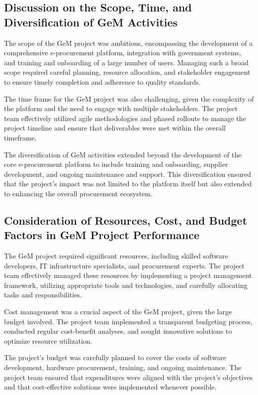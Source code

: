 \subsection{Discussion on the Scope, Time, and Diversification of GeM Activities}

The scope of the GeM project was ambitious, encompassing the development of a comprehensive e-procurement platform, integration with government systems, and training and onboarding of a large number of users. Managing such a broad scope required careful planning, resource allocation, and stakeholder engagement to ensure timely completion and adherence to quality standards.

The time frame for the GeM project was also challenging, given the complexity of the platform and the need to engage with multiple stakeholders. The project team effectively utilized agile methodologies and phased rollouts to manage the project timeline and ensure that deliverables were met within the overall timeframe.

The diversification of GeM activities extended beyond the development of the core e-procurement platform to include training and onboarding, supplier development, and ongoing maintenance and support. This diversification ensured that the project's impact was not limited to the platform itself but also extended to enhancing the overall procurement ecosystem.

\subsection{Consideration of Resources, Cost, and Budget Factors in GeM Project Performance}

The GeM project required significant resources, including skilled software developers, IT infrastructure specialists, and procurement experts. The project team effectively managed these resources by implementing a project management framework, utilizing appropriate tools and technologies, and carefully allocating tasks and responsibilities.

Cost management was a crucial aspect of the GeM project, given the large budget involved. The project team implemented a transparent budgeting process, conducted regular cost-benefit analyses, and sought innovative solutions to optimize resource utilization.

The project's budget was carefully planned to cover the costs of software development, hardware procurement, training, and ongoing maintenance. The project team ensured that expenditures were aligned with the project's objectives and that cost-effective solutions were implemented whenever possible.

